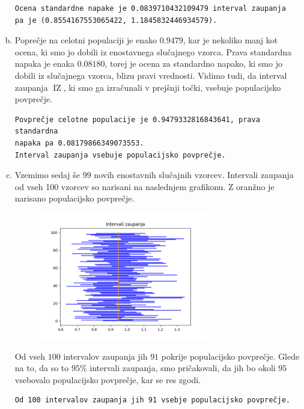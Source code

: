 \documentclass[a4paper,12pt]{article}
\theoremstyle{definition}
\theoremstyle{plain}
\DeclareMathOperator*{\IZ}{IZ}
\begin{document}
\begin{enumerate}[a)]
    \begin{verbatim}
Ocena standardne napake je 0.0839710432109479 interval zaupanja 
pa je (0.8554167553065422, 1.1845832446934579).
    \end{verbatim}

    \item Poprečje na celotni populaciji je enako $0.9479$, kar je nekoliko manj kot ocena, ki smo jo dobili iz enostavnega slučajnego vzorca. Prava standardna napaka je enaka $0.08180$, torej je ocena za standardno napako, ki smo jo dobili iz slučajnega vzorca, blizu pravi vrednosti. Vidimo tudi, da interval zaupanja $\IZ$, ki smo ga izračunali v prejšnji točki, vsebuje populacijsko povprečje.
    
    \begin{verbatim}
Povprečje celotne populacije je 0.9479332816843641, prava standardna 
napaka pa 0.08179866349073553.
Interval zaupanja vsebuje populacijsko povprečje.
    \end{verbatim}
    
    \item Vzemimo sedaj še $99$ novih enostavnih slučajnih vzorcev. Intervali zaupanja od vseh 100 vzorcev so narisani na naslednjem grafikonu. Z oranžno je narisano populacijsko povprečje.
    
    \begin{figure}[H]
        \centering
        \label{fig:iz1}
        \includegraphics[width=0.7\textwidth]{intervaliZaupanja1.png}
    \end{figure}

    Od vseh $100$ intervalov zaupanja jih $91$ pokrije populacijsko povprečje. Glede na to, da so to $95 \%$ intervali zaupanja, smo pričakovali, da jih bo okoli $95$ vsebovalo populacijsko povprečje, kar se res zgodi.

    \begin{verbatim}
Od 100 intervalov zaupanja jih 91 vsebje populacijsko povprečje.
    \end{verbatim}
    

\end{enumerate}
\end{document}
